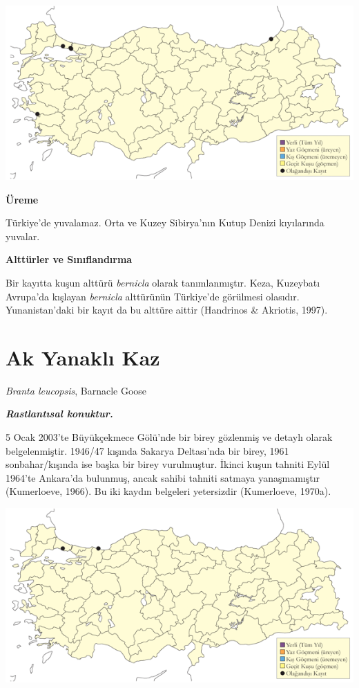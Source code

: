 \documentclass[
  a4paper,
  DIV=11,
  numbers=noendperiod]{scrreprt}
\begin{document}
\includegraphics{images/harita_Page_005.png}

\textbf{Üreme}

Türkiye'de yuvalamaz. Orta ve Kuzey Sibirya'nın Kutup Denizi kıyılarında
yuvalar.

\textbf{Alttürler ve Sınıflandırma}

Bir kayıtta kuşun alttürü \emph{bernicla} olarak tanımlanmıştır. Keza,
Kuzeybatı Avrupa'da kışlayan \emph{bernicla} alttürünün Türkiye'de
görülmesi olasıdır. Yunanistan'daki bir kayıt da bu alttüre aittir
(Handrinos \& Akriotis, 1997).

\section{Ak Yanaklı Kaz}\label{ak-yanaklux131-kaz}

\emph{Branta leucopsis}, Barnacle Goose

\textbf{\emph{Rastlantısal konuktur.}}

5 Ocak 2003'te Büyükçekmece Gölü'nde bir birey gözlenmiş ve detaylı
olarak belgelenmiştir. 1946/47 kışında Sakarya Deltası'nda bir birey,
1961 sonbahar/kışında ise başka bir birey vurulmuştur. İkinci kuşun
tahniti Eylül 1964'te Ankara'da bulunmuş, ancak sahibi tahniti satmaya
yanaşmamıştır (Kumerloeve, 1966). Bu iki kaydın belgeleri yetersizdir
(Kumerloeve, 1970a).

\includegraphics{images/harita_Page_006.png}
\end{document}
